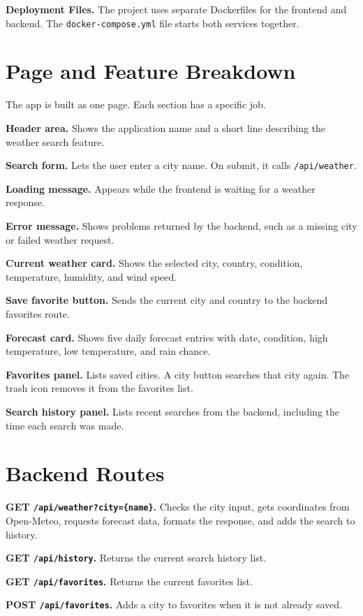 \documentclass[11pt]{article}
\begin{document}
\textbf{Deployment Files.} The project uses separate Dockerfiles for the frontend and backend. The \texttt{docker-compose.yml} file starts both services together.

\section{Page and Feature Breakdown}
The app is built as one page. Each section has a specific job.

\textbf{Header area.} Shows the application name and a short line describing the weather search feature.

\textbf{Search form.} Lets the user enter a city name. On submit, it calls \texttt{/api/weather}.

\textbf{Loading message.} Appears while the frontend is waiting for a weather response.

\textbf{Error message.} Shows problems returned by the backend, such as a missing city or failed weather request.

\textbf{Current weather card.} Shows the selected city, country, condition, temperature, humidity, and wind speed.

\textbf{Save favorite button.} Sends the current city and country to the backend favorites route.

\textbf{Forecast card.} Shows five daily forecast entries with date, condition, high temperature, low temperature, and rain chance.

\textbf{Favorites panel.} Lists saved cities. A city button searches that city again. The trash icon removes it from the favorites list.

\textbf{Search history panel.} Lists recent searches from the backend, including the time each search was made.

\section{Backend Routes}
\textbf{GET \texttt{/api/weather?city=\{name\}}.} Checks the city input, gets coordinates from Open-Meteo, requests forecast data, formats the response, and adds the search to history.

\textbf{GET \texttt{/api/history}.} Returns the current search history list.

\textbf{GET \texttt{/api/favorites}.} Returns the current favorites list.

\textbf{POST \texttt{/api/favorites}.} Adds a city to favorites when it is not already saved.
\end{document}
